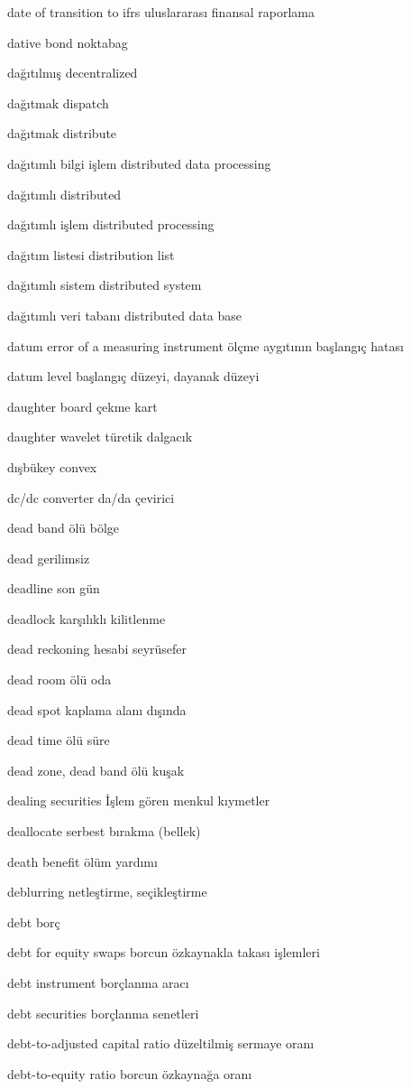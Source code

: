 \documentclass[12pt,fleqn]{article}\usepackage{../../common}
\begin{document}
date of transition to ifrs uluslararası finansal raporlama

dative bond noktabag

dağıtılmış decentralized

dağıtmak dispatch

dağıtmak distribute

dağıtımlı bilgi işlem distributed data processing

dağıtımlı distributed

dağıtımlı işlem distributed processing

dağıtım listesi distribution list

dağıtımlı sistem distributed system

dağıtımlı veri tabanı distributed data base

datum error of a measuring instrument ölçme aygıtının başlangıç hatası

datum level başlangıç düzeyi, dayanak düzeyi

daughter board çekme kart

daughter wavelet türetik dalgacık

dışbükey convex

dc/dc converter da/da çevirici

dead band ölü bölge

dead gerilimsiz

deadline son gün

deadlock karşılıklı kilitlenme

dead reckoning hesabi seyrüsefer

dead room ölü oda

dead spot kaplama alanı dışında

dead time ölü süre

dead zone, dead band ölü kuşak

dealing securities İşlem gören menkul kıymetler

deallocate serbest bırakma (bellek)

death benefit ölüm yardımı

deblurring netleştirme, seçikleştirme

debt borç

debt for equity swaps borcun özkaynakla takası işlemleri

debt instrument borçlanma aracı

debt securities borçlanma senetleri

debt-to-adjusted capital ratio düzeltilmiş sermaye oranı

debt-to-equity ratio borcun özkaynağa oranı
\end{document}
